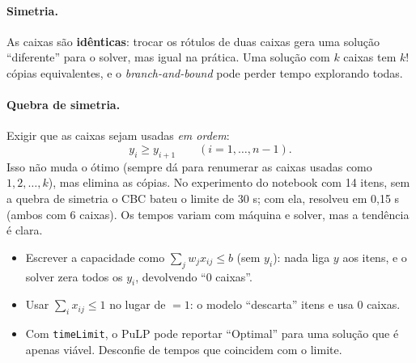 \paragraph{Simetria.} As caixas são \textbf{idênticas}: trocar os rótulos de duas caixas gera uma solução
``diferente'' para o solver, mas igual na prática. Uma solução com $k$ caixas tem $k!$ cópias equivalentes, e o
\emph{branch-and-bound} pode perder tempo explorando todas.

\paragraph{Quebra de simetria.} Exigir que as caixas sejam usadas \emph{em ordem}:
\[
y_i\ge y_{i+1}\qquad(i=1,\dots,n-1).
\]
Isso não muda o ótimo (sempre dá para renumerar as caixas usadas como $1,2,\dots,k$), mas elimina as cópias. No
experimento do notebook com 14 itens, sem a quebra de simetria o CBC bateu o limite de 30 s; com ela, resolveu em
0,15 s (ambos com 6 caixas). Os tempos variam com máquina e solver, mas a tendência é clara.

\begin{atencao}
\begin{itemize}
  \item Escrever a capacidade como $\sum_jw_jx_{ij}\le b$ (sem $y_i$): nada liga $y$ aos itens, e o solver zera
  todos os $y_i$, devolvendo ``0 caixas''.
  \item Usar $\sum_ix_{ij}\le1$ no lugar de $=1$: o modelo ``descarta'' itens e usa 0 caixas.
  \item Com \texttt{timeLimit}, o PuLP pode reportar ``Optimal'' para uma solução que é apenas viável. Desconfie de
  tempos que coincidem com o limite.
\end{itemize}
\end{atencao}
